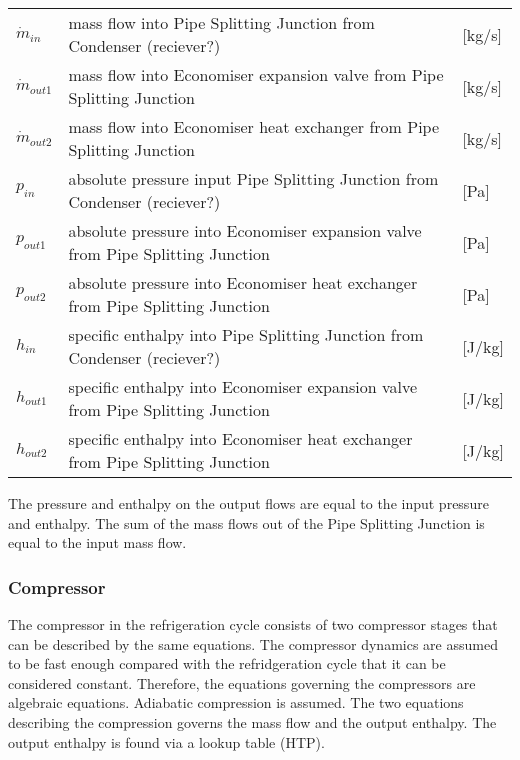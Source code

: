 \begin{center}
	\begin{tabular}{l p{12cm} l}
		$\dot{m}_{in}$ 		& mass flow into Pipe Splitting Junction from Condenser (reciever?) 						& [\si{kg}/\si{s}]\\
		$\dot{m}_{out1}$ 	& mass flow into Economiser expansion valve from Pipe Splitting Junction 				& [\si{kg}/\si{s}]\\
		$\dot{m}_{out2}$ 	& mass flow into Economiser heat exchanger from Pipe Splitting Junction 					& [\si{kg}/\si{s}]\\
		$p_{in}$ 			& absolute pressure input Pipe Splitting Junction from Condenser (reciever?)		& [\si{Pa}]\\
		$p_{out1}$ 			& absolute pressure into Economiser expansion valve from Pipe Splitting Junction 	& [\si{Pa}]\\
		$p_{out2}$ 			& absolute pressure into Economiser heat exchanger from Pipe Splitting Junction 	& [\si{Pa}]\\
		$h_{in}$ 			& specific enthalpy into Pipe Splitting Junction from Condenser (reciever?)   		& [\si{J}/\si{kg}]\\ 
		$h_{out1}$ 			& specific enthalpy into Economiser expansion valve from Pipe Splitting Junction	& [\si{J}/\si{kg}]\\ 
		$h_{out2}$ 			& specific enthalpy into Economiser heat exchanger from Pipe Splitting Junction		& [\si{J}/\si{kg}]\\ 
	\end{tabular}
\end{center}


The pressure and enthalpy on the output flows are equal to the input pressure and enthalpy. The sum of the mass flows out of the Pipe Splitting Junction is equal to the input mass flow. \\

\subsubsection{Compressor}
The compressor in the refrigeration cycle consists of two compressor stages that can be described by the same equations.
The compressor dynamics are assumed to be fast enough compared with the refridgeration cycle that it can be considered constant. Therefore, the equations governing the compressors are algebraic equations. 
Adiabatic compression is assumed. 
The two equations describing the compression governs the mass flow and the output enthalpy. The output enthalpy is found via a lookup table (HTP). 

